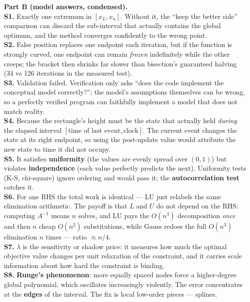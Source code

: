 \begin{qabox}
\textbf{Part B (model answers, condensed).}\\[3pt]
\textbf{S1.} Exactly one extremum in $[x_L,x_u]$. Without it, the ``keep the better side'' comparison can discard the sub-interval that actually contains the global optimum, and the method converges confidently to the wrong point.\\
\textbf{S2.} False position replaces one endpoint each iteration, but if the function is strongly curved, one endpoint can remain \emph{frozen} indefinitely while the other creeps; the bracket then shrinks far slower than bisection's guaranteed halving (34 vs 126 iterations in the measured test).\\
\textbf{S3.} Validation failed. Verification only asks ``does the code implement the conceptual model correctly?''; the model's assumptions themselves can be wrong, so a perfectly verified program can faithfully implement a model that does not match reality.\\
\textbf{S4.} Because the rectangle's height must be the state that actually held \emph{during} the elapsed interval $[\text{time of last event}, \text{clock}]$. The current event changes the state at its right endpoint, so using the post-update value would attribute the new state to time it did not occupy.\\
\textbf{S5.} It satisfies \textbf{uniformity} (the values are evenly spread over $(0,1)$) but violates \textbf{independence} (each value perfectly predicts the next). Uniformity tests (K-S, chi-square) ignore ordering and would pass it; the \textbf{autocorrelation test} catches it.\\
\textbf{S6.} For one RHS the total work is identical --- LU just relabels the same elimination arithmetic. The payoff is that $L$ and $U$ do not depend on the RHS: computing $A^{-1}$ means $n$ solves, and LU pays the $O(n^3)$ decomposition \emph{once} and then $n$ cheap $O(n^2)$ substitutions, while Gauss redoes the full $O(n^3)$ elimination $n$ times --- ratio $\approx n/4$.\\
\textbf{S7.} $\lambda$ is the sensitivity or shadow price: it measures how much the optimal objective value changes per unit relaxation of the constraint, and it carries scale information about how hard the constraint is binding.\\
\textbf{S8.} \textbf{Runge's phenomenon}: more equally spaced nodes force a higher-degree global polynomial, which oscillates increasingly violently. The error concentrates at the \textbf{edges} of the interval. The fix is local low-order pieces --- splines.\\

\end{qabox}
